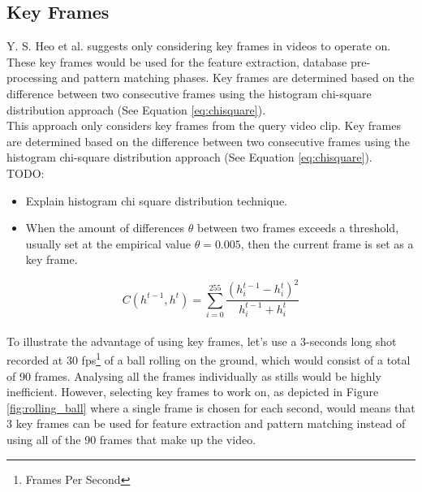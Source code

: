 \subsection{Key Frames}

Y. S. Heo et al. \cite{heo2016colortransfer} suggests only considering key frames in videos to operate on. These key frames would be used for the feature extraction, database pre-processing and pattern matching phases. Key frames are determined based on the difference between two consecutive frames using the histogram chi-square distribution approach (See Equation \ref{eq:chisquare}).\\

\cite{heo2016colortransfer}
This approach only considers key frames from the query video clip. Key frames are determined based on the difference between two consecutive frames using the histogram chi-square distribution approach (See Equation \ref{eq:chisquare}).\\

TODO:
\begin{itemize}
    \item Explain histogram chi square distribution technique.
    \item When the amount of differences $\theta$ between two frames exceeds a threshold, usually set at the empirical value $\theta = 0.005$, then the current frame is set as a key frame.
\end{itemize}

\begingroup \Large \begin{equation} \label{eq:chisquare}
    C(h^{t-1}, h^{t}) = \sum_{i=0}^{255} \frac{(h_{i}^{t-1} - h_{i}^{t})^2}{h_{i}^{t-1} + h_{i}^{t}}
\end{equation} \endgroup \\

To illustrate the advantage of using key frames, let's use a 3-seconds long shot recorded at 30 fps\footnote{Frames Per Second} of a ball rolling on the ground, which would consist of a total of 90 frames. Analysing all the frames individually as stills would be highly inefficient. However, selecting key frames to work on, as depicted in Figure \ref{fig:rolling_ball} where a single frame is chosen for each second, would means that 3 key frames can be used for feature extraction and pattern matching instead of using all of the 90 frames that make up the video.\\

